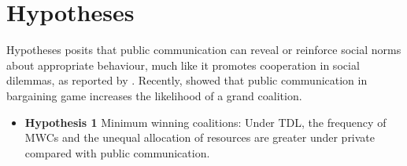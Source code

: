 \documentclass[aspectratio=169, xcolor=table]{beamer}
\begin{document}
\section{Hypotheses}

\begin{frame}{Hypotheses}\justifying
\cite{woon2024discussion} posits that public communication can reveal or reinforce social norms about appropriate behaviour, much like it promotes cooperation in social dilemmas, as reported by \cite{bicchieri2007computer}. Recently, \cite{shinoda2026core} showed that public communication in bargaining game increases the likelihood of a grand coalition.

\vspace{0.5\baselineskip} 
\begin{itemize}
    \item \textbf{Hypothesis 1} Minimum winning coalitions: Under TDL, the frequency of MWCs and the unequal allocation of resources are greater under private compared with public communication.
\end{itemize}
\end{frame}
\end{document}
